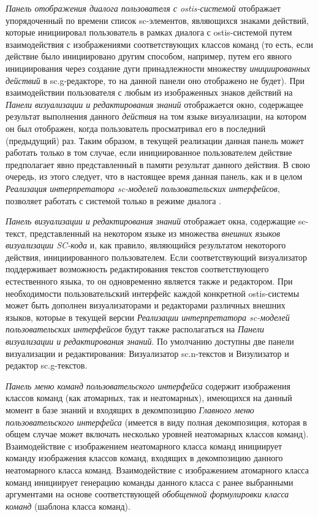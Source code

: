 \textit{Панель отображения диалога пользователя с ostis-системой} отображает упорядоченный по времени список sc-элементов, являющихся знаками действий, которые инициировал пользователь в рамках диалога с ostis-системой путем взаимодействия с изображениями соответствующих классов команд (то есть, если действие было инициировано другим способом, например, путем его явного инициирования через создание дуги принадлежности множеству \textit{инициированных действий} в sc.g-редакторе, то на данной панели оно отображено не будет). При взаимодействии пользователя с любым из изображенных знаков действий на \textit{Панели визуализации и редактирования знаний} отображается окно, содержащее результат выполнения данного \textit{действия} на том языке визуализации, на котором он был отображен, когда пользователь просматривал его в последний (предыдущий) раз. Таким образом, в текущей реализации данная панель может работать только в том случае, если инициированное пользователем действие предполагает явно представленный в памяти результат данного действия. В свою очередь, из этого следует, что в настоящее время данная панель, как и в целом \textit{Реализация интерпретатора sc-моделей пользовательских интерфейсов}, позволяет работать с системой только в режиме диалога .

\textit{Панель визуализации и редактирования знаний} отображает окна, содержащие sc-текст, представленный на некотором языке из множества \textit{внешних языков визуализации SC-кода} и, как правило, являющийся результатом некоторого действия, инициированного пользователем. Если соответствующий визуализатор поддерживает возможность редактирования текстов соответствующего естественного языка, то он одновременно является также и редактором. При необходимости пользовательский интерфейс каждой конкретной ostis-системы может быть дополнен визуализаторами и редакторами различных внешних языков, которые в текущей версии \textit{Реализации интерпретатора sc-моделей пользовательских интерфейсов} будут также располагаться на \textit{Панели визуализации и редактирования знаний}. По умолчанию доступны две панели визуализации и редактирования: Визуализатор sc.n-текстов и Визулизатор и редактор sc.g-текстов.

\textit{Панель меню команд пользовательского интерфейса} содержит изображения классов команд (как атомарных, так и неатомарных), имеющихся на данный момент в базе знаний и входящих в декомпозицию \textit{Главного меню пользовательского интерфейса} (имеется в виду полная декомпозиция, которая в общем случае может включать несколько уровней неатомарных классов команд). Взаимодействие с изображением неатомарного класса команд инициирует команду изображения классов команд, входящих в декомпозицию данного неатомарного класса команд. Взаимодействие с изображением атомарного класса команд инициирует генерацию команды данного класса с ранее выбранными аргументами на основе соответствующей \textit{обобщенной формулировки класса команд} (шаблона класса команд).

